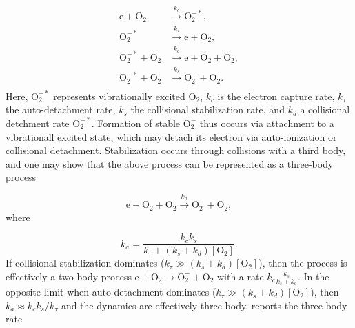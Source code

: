 \documentclass{iopjournal}
\newcommand{\e}{\ensuremath{\text{e}}}
\providecommand\Otwo{\ensuremath{\textrm{O}_2}}
\providecommand\Otwom{\ensuremath{\textrm{O}_2^-}}
\providecommand\Otwoms{\ensuremath{\textrm{O}_2^{-*}}}
\begin{document}
\begin{align}
  \e + \Otwo &\xrightarrow{k_c} \Otwoms,\\
  \Otwoms &\xrightarrow{k_\tau} \e + \Otwo,\\
  \Otwoms + \Otwo &\xrightarrow{k_d} \e + \Otwo + \Otwo,\\
  \Otwoms + \Otwo &\xrightarrow{k_s} \Otwom + \Otwo.\\
\end{align}
Here, $\Otwoms$ represents vibrationally excited $\Otwo$, $k_c$ is the electron capture rate, $k_\tau$ the auto-detachment rate, $k_s$ the collisional stabilization rate, and $k_d$ a collisional detchment rate $\Otwoms$.
Formation of stable $\Otwom$ thus occurs via attachment to a vibrationall excited state, which may detach its electron via auto-ionization or collisional detachment.
Stabilization occurs through collisions with a third body, and one may show that the above process can be represented as a three-body process

\begin{equation}
  \e + \Otwo + \Otwo \xrightarrow{k_a} \Otwom + \Otwo,
\end{equation}
where

\begin{equation}
  k_a = \frac{k_c k_s}{k_\tau + \left(k_s + k_d\right)\left[\Otwo\right]}.
\end{equation}
If collisional stabilization dominates ($k_\tau \gg \left(k_s + k_d\right)\left[\Otwo\right]$), then the process is effectively a two-body process $\e + \Otwo \rightarrow \Otwom + \Otwo$ with a rate $k_c \frac{k_s}{k_s + k_d}$.
In the opposite limit when auto-detachment dominates ($k_\tau \gg \left(k_s + k_d\right)\left[\Otwo\right]$), then $k_a\approx k_c k_s/k_\tau$ and the dynamics are effectively three-body.
\textcite{Kossyi1992} reports the three-body rate
\end{document}
